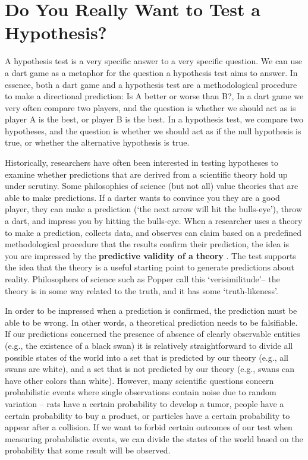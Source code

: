 \documentclass[
]{krantz}
\begin{document}
\hypertarget{do-you-really-want-to-test-a-hypothesis}{%
\section{Do You Really Want to Test a Hypothesis?}\label{do-you-really-want-to-test-a-hypothesis}}

A hypothesis test is a very specific answer to a very specific question. We can use a dart game as a metaphor for the question a hypothesis test aims to answer. In essence, both a dart game and a hypothesis test are a methodological procedure to make a directional prediction: Is A better or worse than B?, In a dart game we very often compare two players, and the question is whether we should act as is player A is the best, or player B is the best. In a hypothesis test, we compare two hypotheses, and the question is whether we should act as if the null hypothesis is true, or whether the alternative hypothesis is true.

Historically, researchers have often been interested in testing hypotheses to examine whether predictions that are derived from a scientific theory hold up under scrutiny. Some philosophies of science (but not all) value theories that are able to make predictions. If a darter wants to convince you they are a good player, they can make a prediction (`the next arrow will hit the bulls-eye'), throw a dart, and impress you by hitting the bulls-eye. When a researcher uses a theory to make a prediction, collects data, and observes can claim based on a predefined methodological procedure that the results confirm their prediction, the idea is you are impressed by the \textbf{predictive validity of a theory} \citep{de_groot_methodology_1969}. The test supports the idea that the theory is a useful starting point to generate predictions about reality. Philosophers of science such as Popper call this `verisimilitude'-- the theory is in some way related to the truth, and it has some `truth-likeness'.

In order to be impressed when a prediction is confirmed, the prediction must be able to be wrong. In other words, a theoretical prediction needs to be falsifiable. If our predictions concerned the presence of absence of clearly observable entities (e.g., the existence of a black swan) it is relatively straightforward to divide all possible states of the world into a set that is predicted by our theory (e.g., all swans are white), and a set that is not predicted by our theory (e.g., swans can have other colors than white). However, many scientific questions concern probabilistic events where single observations contain noise due to random variation -- rats have a certain probability to develop a tumor, people have a certain probability to buy a product, or particles have a certain probability to appear after a collision. If we want to forbid certain outcomes of our test when measuring probabilistic events, we can divide the states of the world based on the probability that some result will be observed.
\end{document}
